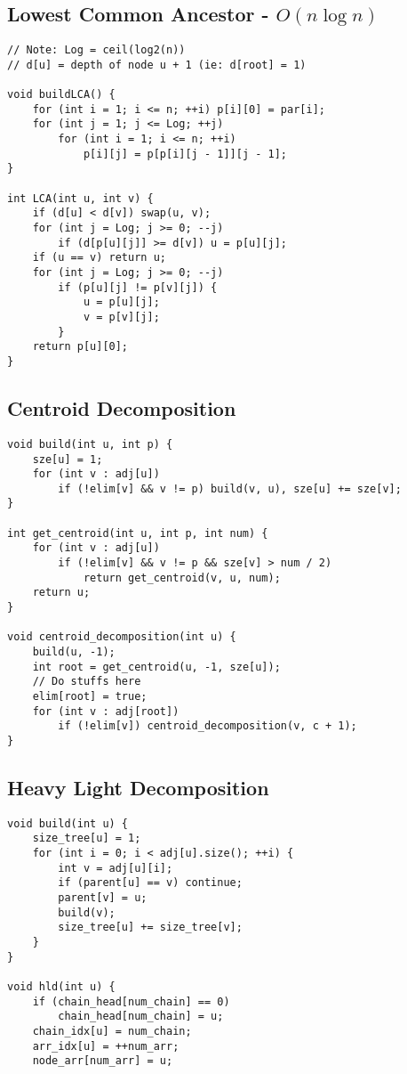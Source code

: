 \documentclass[10pt,landscape]{article}
\begin{document}
\begin{multicols}{2}
\subsection{Lowest Common Ancestor - $O(n\log n)$}
\begin{lstlisting}
// Note: Log = ceil(log2(n))
// d[u] = depth of node u + 1 (ie: d[root] = 1)

void buildLCA() {
    for (int i = 1; i <= n; ++i) p[i][0] = par[i];
    for (int j = 1; j <= Log; ++j)
        for (int i = 1; i <= n; ++i)
            p[i][j] = p[p[i][j - 1]][j - 1];
}

int LCA(int u, int v) {
    if (d[u] < d[v]) swap(u, v);
    for (int j = Log; j >= 0; --j)
        if (d[p[u][j]] >= d[v]) u = p[u][j];
    if (u == v) return u;
    for (int j = Log; j >= 0; --j)
        if (p[u][j] != p[v][j]) {
            u = p[u][j];
            v = p[v][j];
        }
    return p[u][0];
}
\end{lstlisting}
\subsection{Centroid Decomposition}
\begin{lstlisting}
void build(int u, int p) {
    sze[u] = 1;
    for (int v : adj[u])
        if (!elim[v] && v != p) build(v, u), sze[u] += sze[v];
}

int get_centroid(int u, int p, int num) {
    for (int v : adj[u])
        if (!elim[v] && v != p && sze[v] > num / 2)
            return get_centroid(v, u, num);
    return u;
}

void centroid_decomposition(int u) {
    build(u, -1);
    int root = get_centroid(u, -1, sze[u]);
    // Do stuffs here
    elim[root] = true;
    for (int v : adj[root])
        if (!elim[v]) centroid_decomposition(v, c + 1);
}
\end{lstlisting}
\subsection{Heavy Light Decomposition}
\begin{lstlisting}
void build(int u) {
    size_tree[u] = 1;
    for (int i = 0; i < adj[u].size(); ++i) {
        int v = adj[u][i];
        if (parent[u] == v) continue;
        parent[v] = u;
        build(v);
        size_tree[u] += size_tree[v];
    }
}

void hld(int u) {
    if (chain_head[num_chain] == 0)
        chain_head[num_chain] = u;
    chain_idx[u] = num_chain;
    arr_idx[u] = ++num_arr;
    node_arr[num_arr] = u;
    

\end{lstlisting}
\end{multicols}
\end{document}

